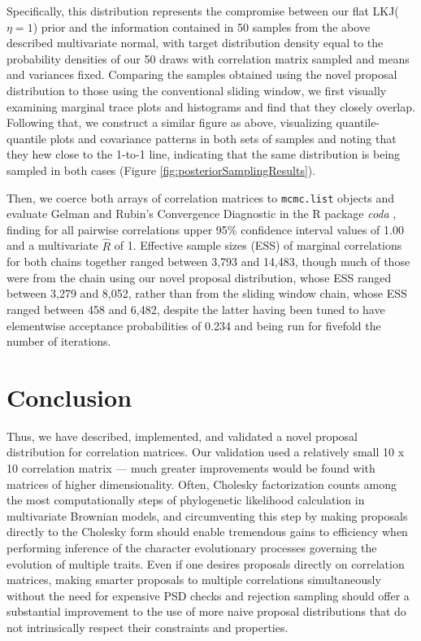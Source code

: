 Specifically, this distribution represents the compromise between our flat LKJ($\eta = 1$) prior and the information contained in 50 samples from the above described multivariate normal, with target distribution density equal to the probability densities of our 50 draws with correlation matrix sampled and means and variances fixed. Comparing the samples obtained using the novel proposal distribution to those using the conventional sliding window, we first visually examining marginal trace plots and histograms and find that they closely overlap. Following that, we construct a similar figure as above, visualizing quantile-quantile plots and covariance patterns in both sets of samples and noting that they hew close to the 1-to-1 line, indicating that the same distribution is being sampled in both cases (Figure \ref{fig:posteriorSamplingResults}).

Then, we coerce both arrays of correlation matrices to \texttt{mcmc.list} objects and evaluate Gelman and Rubin's Convergence Diagnostic \citep{gelmanInferenceIterativeSimulation1992} in the R package \textit{coda} \citep{plummerCODAConvergenceDiagnosis2006}, finding for all pairwise correlations upper 95\% confidence interval values of 1.00 and a multivariate \(\hat{R}\) of 1. Effective sample sizes (ESS) of marginal correlations for both chains together ranged between 3,793 and 14,483, though much of those were from the chain using our novel proposal distribution, whose ESS ranged between 3,279 and 8,052, rather than from the sliding window chain, whose ESS ranged between 458 and 6,482, despite the latter having been tuned to have elementwise acceptance probabilities of 0.234 and being run for fivefold the number of iterations. 

\clearpage

\section{Conclusion}

Thus, we have described, implemented, and validated a novel proposal distribution for correlation matrices. Our validation used a relatively small 10 x 10 correlation matrix --- much greater improvements would be found with matrices of higher dimensionality. Often, Cholesky factorization counts among the most computationally steps of phylogenetic likelihood calculation in multivariate Brownian models, and circumventing this step by making proposals directly to the Cholesky form should enable tremendous gains to efficiency when performing inference of the character evolutionary processes governing the evolution of multiple traits. Even if one desires proposals directly on correlation matrices, making smarter proposals to multiple correlations simultaneously without the need for expensive PSD checks and rejection sampling should offer a substantial improvement to the use of more naive proposal distributions that do not intrinsically respect their constraints and properties.

